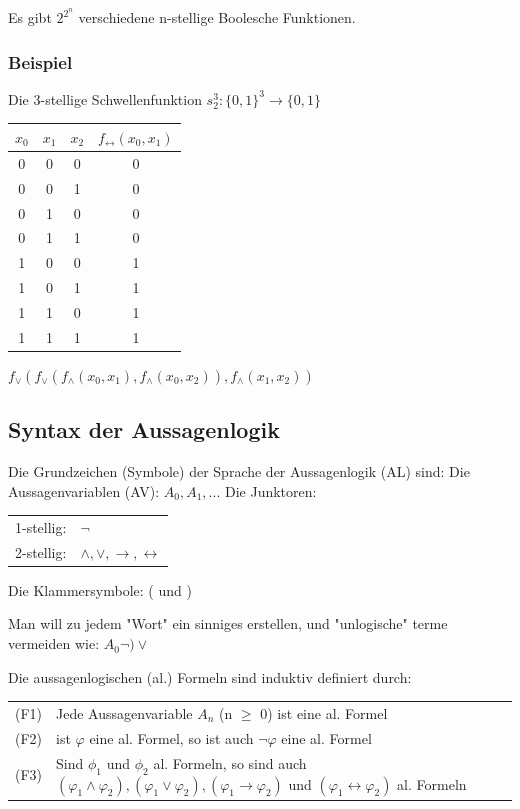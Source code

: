 \documentclass[12pt,a4paper]{article} %
\begin{document}
Es gibt $2^{2^n}$ verschiedene n-stellige Boolesche Funktionen.

\subsubsection{Beispiel}
Die 3-stellige Schwellenfunktion $s_2^3:\{0, 1\}^3 \rightarrow \{0, 1\}$

\begin{tabular}{c | c | c | c}
	$x_0$ & $x_1$ & $x_2$ & $f_{\leftrightarrow}(x_0, x_1)$ \\ \hline
	0 & 0 & 0 & 0 \\
	0 & 0 & 1 & 0 \\
	0 & 1 & 0 & 0 \\
	0 & 1 & 1 & 0 \\
	1 & 0 & 0 & 1 \\
	1 & 0 & 1 & 1 \\
	1 & 1 & 0 & 1 \\
	1 & 1 & 1 & 1 \\
\end{tabular}
{} \newline
{} \newline
{} \newline
$f_{\vee}(f_{\vee}(f_{\wedge}(x_0, x_1), f_{\wedge}(x_0, x_2)), f_{\wedge}(x_1, x_2))$

\subsection{Syntax der Aussagenlogik}
Die Grundzeichen (Symbole) der Sprache der Aussagenlogik (AL) sind: \newline
Die Aussagenvariablen (AV): $A_0, A_1, ...$ \newline
Die Junktoren: 

\begin{tabular}{l l}
	1-stellig: & $\neg$ \\
	2-stellig: & $\wedge, \vee, \rightarrow, \leftrightarrow$
\end{tabular}

Die Klammersymbole: ( und )

Man will zu jedem "Wort" ein sinniges erstellen, und "unlogische" terme vermeiden wie: $A_0 \neg ) \vee$

Die aussagenlogischen (al.) Formeln sind induktiv definiert durch:

\begin{tabular}{l l}
	(F1) & Jede Aussagenvariable $A_n$ (n $\ge$ 0) ist eine al. Formel \\
	(F2) & ist $\varphi$ eine al. Formel, so ist auch $\neg\varphi$ eine al. Formel \\
	(F3) & Sind $\phi_1$ und $\phi_2$ al. Formeln, so sind auch $(\varphi_1 \wedge \varphi_2), (\varphi_1 \vee \varphi_2), (\varphi_1 \rightarrow \varphi_2)$ und $(\varphi_1 \leftrightarrow \varphi_2)$ al. Formeln
\end{tabular}
\end{document}
